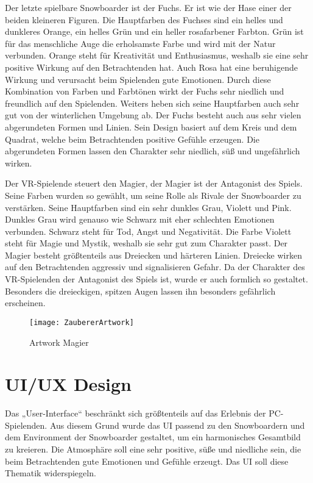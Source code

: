 Der letzte spielbare Snowboarder ist der Fuchs. Er ist wie der Hase einer der beiden kleineren Figuren. Die Hauptfarben des Fuchses sind ein helles und dunkleres Orange, ein helles Grün und ein heller rosafarbener Farbton. Grün ist für das menschliche Auge die erholsamste Farbe und wird mit der Natur verbunden. Orange steht für Kreativität und Enthusiasmus, weshalb sie eine sehr positive Wirkung auf den Betrachtenden hat. Auch Rosa hat eine beruhigende Wirkung und verursacht beim Spielenden gute Emotionen. Durch diese Kombination von Farben und Farbtönen wirkt der Fuchs sehr niedlich und freundlich auf den Spielenden. Weiters heben sich seine Hauptfarben auch sehr gut von der winterlichen Umgebung ab.
Der Fuchs besteht auch aus sehr vielen abgerundeten Formen und Linien. Sein Design basiert auf dem Kreis und dem Quadrat, welche beim Betrachtenden positive Gefühle erzeugen. Die abgerundeten Formen lassen den Charakter sehr niedlich, süß und ungefährlich wirken. 



Der VR-Spielende steuert den Magier, der Magier ist der Antagonist des Spiels. Seine Farben wurden so gewählt, um seine Rolle als Rivale der Snowboarder zu verstärken. Seine Hauptfarben sind ein sehr dunkles Grau, Violett und Pink. Dunkles Grau wird genauso wie Schwarz mit eher schlechten Emotionen verbunden. Schwarz steht für Tod, Angst und Negativität. Die Farbe Violett steht für Magie und Mystik, weshalb sie sehr gut zum Charakter passt.
Der Magier besteht größtenteils aus Dreiecken und härteren Linien. Dreiecke wirken auf den Betrachtenden aggressiv und signalisieren Gefahr. Da der Charakter des VR-Spielenden der Antagonist des Spiels ist, wurde er auch formlich so gestaltet. Besonders die dreieckigen, spitzen Augen lassen ihn besonders gefährlich erscheinen.

\begin{figure}[H]
	\centering
	\texttt{[image: ZaubererArtwork]}
	\caption{Artwork Magier}
\end{figure}


\section{UI/UX Design}
Das „User-Interface“ beschränkt sich größtenteils auf das Erlebnis der PC-Spielenden. Aus diesem Grund wurde das UI passend zu den Snowboardern und dem Environment der Snowboarder gestaltet, um ein harmonisches Gesamtbild zu kreieren. Die Atmosphäre soll eine sehr positive, süße und niedliche sein, die beim Betrachtenden gute Emotionen und Gefühle erzeugt. Das UI soll diese Thematik widerspiegeln.


